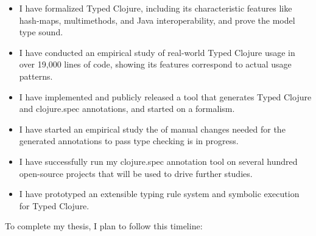 \documentclass[9pt]{extarticle}
\begin{document}
\begin{itemize}
  \item I have formalized Typed Clojure, including
    its characteristic features like hash-maps, multimethods, and Java interoperability,
    and prove the model type sound.
  \item I have conducted an empirical study of real-world Typed Clojure usage
    in over 19,000 lines of code, showing its features correspond to actual usage patterns.
  \item I have implemented and publicly released a tool that generates
    Typed Clojure and clojure.spec annotations, and started on a formalism.
  \item I have started an empirical study the of manual changes needed for the generated annotations
    to pass type checking is in progress.
  \item I have successfully run my clojure.spec annotation tool on several hundred open-source projects that
    will be used to drive further studies.
  \item I have prototyped an extensible typing rule system and symbolic execution for Typed Clojure.
\end{itemize}

To complete my thesis, I plan to follow this timeline:
\end{document}
